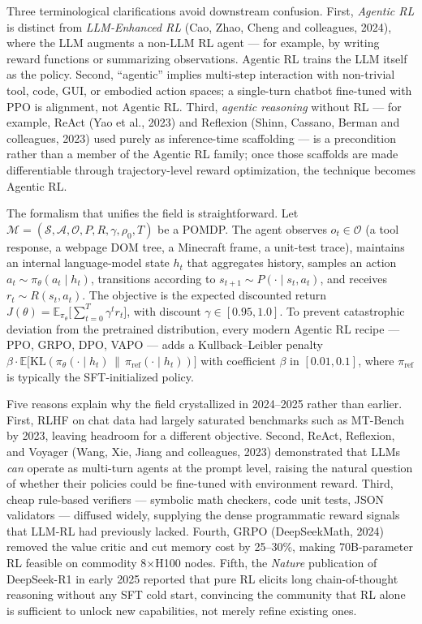 Three terminological clarifications avoid downstream confusion. First, \emph{Agentic RL} is distinct from \emph{LLM-Enhanced RL} (Cao, Zhao, Cheng and colleagues, 2024), where the LLM augments a non-LLM RL agent --- for example, by writing reward functions or summarizing observations. Agentic RL trains the LLM itself as the policy. Second, ``agentic'' implies multi-step interaction with non-trivial tool, code, GUI, or embodied action spaces; a single-turn chatbot fine-tuned with PPO is alignment, not Agentic RL. Third, \emph{agentic reasoning} without RL --- for example, ReAct (Yao et al., 2023) and Reflexion (Shinn, Cassano, Berman and colleagues, 2023) used purely as inference-time scaffolding --- is a precondition rather than a member of the Agentic RL family; once those scaffolds are made differentiable through trajectory-level reward optimization, the technique becomes Agentic RL.

The formalism that unifies the field is straightforward. Let \(\mathcal{M} = (\mathcal{S}, \mathcal{A}, \mathcal{O}, P, R, \gamma, \rho_0, T)\) be a POMDP. The agent observes \(o_t \in \mathcal{O}\) (a tool response, a webpage DOM tree, a Minecraft frame, a unit-test trace), maintains an internal language-model state \(h_t\) that aggregates history, samples an action \(a_t \sim \pi_\theta(a_t \mid h_t)\), transitions according to \(s_{t+1} \sim P(\cdot \mid s_t, a_t)\), and receives \(r_t \sim R(s_t, a_t)\). The objective is the expected discounted return \(J(\theta) = \mathbb{E}_{\pi_\theta}\bigl[\sum_{t=0}^{T} \gamma^t r_t\bigr]\), with discount \(\gamma \in [0.95, 1.0]\). To prevent catastrophic deviation from the pretrained distribution, every modern Agentic RL recipe --- PPO, GRPO, DPO, VAPO --- adds a Kullback--Leibler penalty \(\beta \cdot \mathbb{E}\bigl[\mathrm{KL}(\pi_\theta(\cdot\mid h_t) \,\|\, \pi_{\mathrm{ref}}(\cdot\mid h_t))\bigr]\) with coefficient \(\beta\) in \([0.01, 0.1]\), where \(\pi_{\mathrm{ref}}\) is typically the SFT-initialized policy.

Five reasons explain why the field crystallized in 2024--2025 rather than earlier. First, RLHF on chat data had largely saturated benchmarks such as MT-Bench by 2023, leaving headroom for a different objective. Second, ReAct, Reflexion, and Voyager (Wang, Xie, Jiang and colleagues, 2023) demonstrated that LLMs \emph{can} operate as multi-turn agents at the prompt level, raising the natural question of whether their policies could be fine-tuned with environment reward. Third, cheap rule-based verifiers --- symbolic math checkers, code unit tests, JSON validators --- diffused widely, supplying the dense programmatic reward signals that LLM-RL had previously lacked. Fourth, GRPO (DeepSeekMath, 2024) removed the value critic and cut memory cost by 25--30\%, making 70B-parameter RL feasible on commodity 8×H100 nodes. Fifth, the \emph{Nature} publication of DeepSeek-R1 in early 2025 reported that pure RL elicits long chain-of-thought reasoning without any SFT cold start, convincing the community that RL alone is sufficient to unlock new capabilities, not merely refine existing ones.

